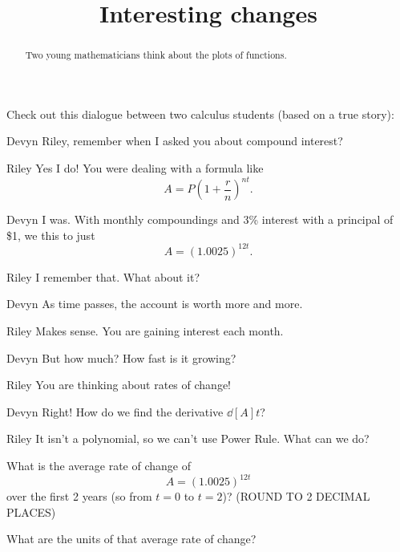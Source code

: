 \documentclass{ximera}
\title[Break-Ground:]{Interesting changes}
\begin{document}
\begin{abstract}
  Two young mathematicians think about the plots of functions.
\end{abstract}
\maketitle

Check out this dialogue between two calculus students (based on a true
story):

\begin{dialogue}
\item[Devyn] Riley, remember when I asked you about compound interest?
\item[Riley] Yes I do!  You were dealing with a formula like \[ A = P\left( 1 + \dfrac{r}{n} \right)^{nt}.\]
\item[Devyn] I was.  With monthly compoundings and 3\% interest with a principal of \$1, we this to just
			\[ A = (1.0025)^{12t}.\]
\item[Riley] I remember that. What about it?
\item[Devyn] As time passes, the account is worth more and more.
\item[Riley] Makes sense.  You are gaining interest each month.
\item[Devyn] But how much?  How fast is it growing?
\item[Riley] You are thinking about rates of change!  
\item[Devyn] Right!  How do we find the derivative $\dd[A]t$?
\item[Riley] It isn't a polynomial, so we can't use Power Rule.  What can we do?

\end{dialogue}

\begin{problem}
  What is the average rate of change of \[A = (1.0025)^{12t}\] over the first 2 years (so from $t=0$ to $t=2$)?  (ROUND TO 2 DECIMAL PLACES)
  \begin{multipleChoice}
  \end{multipleChoice}
\end{problem}

\begin{problem}
  What are the units of that average rate of change?
    \begin{multipleChoice}
  \end{multipleChoice}
\end{problem}


%
\end{document}
